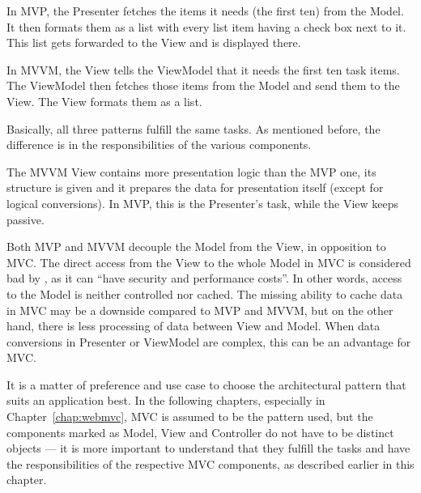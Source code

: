 In MVP, the Presenter fetches the items it needs (the first ten) from the Model. It then formats them as a list with every list item having a check box next to it. This list gets forwarded to the View and is displayed there.

In MVVM, the View tells the ViewModel that it needs the first ten task items. The ViewModel then fetches those items from the Model and send them to the View. The View formats them as a list.

Basically, all three patterns fulfill the same tasks. As mentioned before, the difference is in the responsibilities of the various components.

The MVVM View contains more presentation logic than the MVP one, its structure is given and it prepares the data for presentation itself (except for logical conversions). In MVP, this is the Presenter's task, while the View keeps passive.

Both MVP and MVVM decouple the Model from the View, in opposition to MVC. The direct access from the View to the whole Model in MVC is considered bad by , as it can ``have security and performance costs''. In other words, access to the Model is neither controlled nor cached. The missing ability to cache data in MVC may be a downside compared to MVP and MVVM, but on the other hand, there is less processing of data between View and Model. When data conversions in Presenter or ViewModel are complex, this can be an advantage for MVC.

It is a matter of preference and use case to choose the architectural pattern that suits an application best. In the following chapters, especially in Chapter~\ref{chap:webmvc}, MVC is assumed to be the pattern used, but the components marked as Model, View and Controller do not have to be distinct objects --- it is more important to understand that they fulfill the tasks and have the responsibilities of the respective MVC components, as described earlier in this chapter.